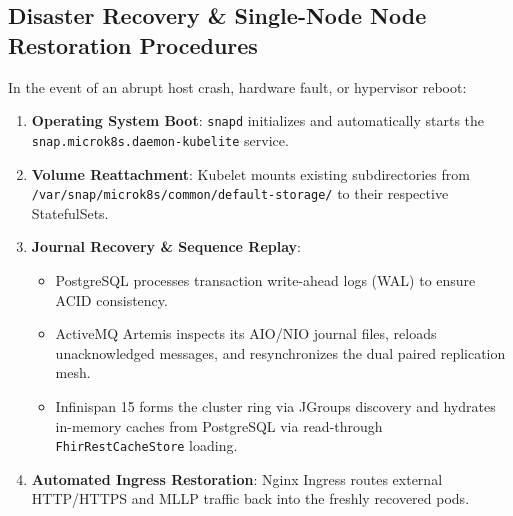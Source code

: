 \subsection{Disaster Recovery \& Single-Node Node Restoration Procedures}

In the event of an abrupt host crash, hardware fault, or hypervisor reboot:
\begin{enumerate}[label=\textbf{\arabic*.}]
    \item \textbf{Operating System Boot}: \texttt{snapd} initializes and automatically starts the \texttt{snap.microk8s.daemon-kubelite} service.
    \item \textbf{Volume Reattachment}: Kubelet mounts existing subdirectories from \texttt{/var/snap/microk8s/common/default-storage/} to their respective StatefulSets.
    \item \textbf{Journal Recovery \& Sequence Replay}:
    \begin{itemize}
        \item PostgreSQL processes transaction write-ahead logs (WAL) to ensure ACID consistency.
        \item ActiveMQ Artemis inspects its AIO/NIO journal files, reloads unacknowledged messages, and resynchronizes the dual paired replication mesh.
        \item Infinispan 15 forms the cluster ring via JGroups discovery and hydrates in-memory caches from PostgreSQL via read-through \texttt{FhirRestCacheStore} loading.
    \end{itemize}
    \item \textbf{Automated Ingress Restoration}: Nginx Ingress routes external HTTP/HTTPS and MLLP traffic back into the freshly recovered pods.
\end{enumerate}
